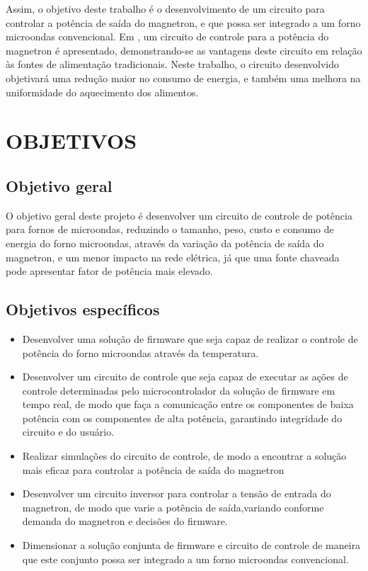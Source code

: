  Assim, o objetivo deste trabalho é o desenvolvimento de um circuito para controlar a potência de saída do magnetron, e que possa ser integrado a um forno microondas convencional. Em \cite{Hidenori1991}, um circuito de controle para a potência do magnetron é apresentado, demonstrando-se as vantagens deste circuito em relação às fontes de alimentação tradicionais. Neste trabalho, o circuito desenvolvido objetivará uma redução maior no consumo de energia, e também uma melhora na uniformidade do aquecimento dos alimentos.


\section{OBJETIVOS}
\label{sec:objetivos}


\subsection{Objetivo geral}
\label{sec:objetivosGerais}

O objetivo geral deste projeto é desenvolver um circuito de controle de potência para fornos de microondas, reduzindo o tamanho, peso, custo e consumo de energia do forno microondas, através da variação da potência de saída do magnetron, e um menor impacto na rede elétrica, já que uma fonte chaveada pode apresentar fator de potência mais elevado.

\subsection{Objetivos específicos}
\label{sec:objetivosEspecificos}

\begin{itemize}
    \item Desenvolver uma solução de  firmware que seja capaz de realizar o controle de potência do forno microondas através da temperatura. 
    \item Desenvolver um circuito de controle que seja capaz de executar as ações de controle determinadas pelo microcontrolador da solução de firmware em tempo real, de modo que faça a comunicação entre os componentes de baixa potência com os componentes de alta potência, garantindo integridade do circuito e do usuário. 
    \item Realizar simulações do circuito de controle, de modo a encontrar a solução mais eficaz para controlar a potência de saída do magnetron
    \item Desenvolver um circuito inversor para controlar a tensão de entrada do magnetron, de modo que varie a potência de saída,variando conforme demanda do magnetron e decisões do firmware.
    \item Dimensionar a solução conjunta de firmware e circuito de controle de maneira que este conjunto possa ser integrado a um forno microondas convencional.

\end{itemize}


